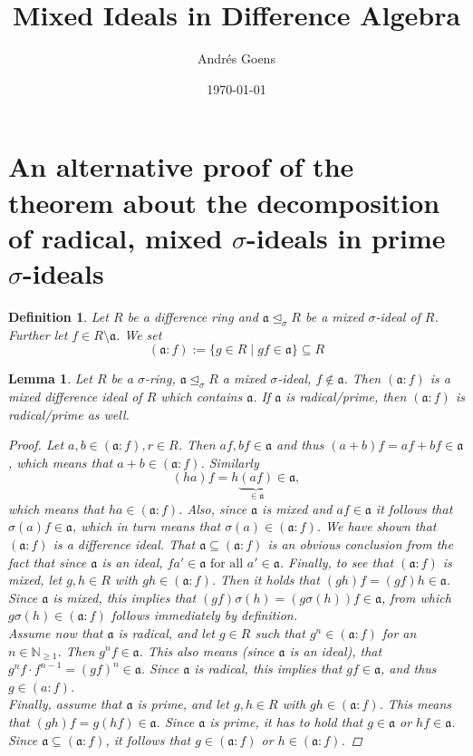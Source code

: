 \documentclass{article}
\title{Mixed Ideals in Difference Algebra}
\author{Andr\'{e}s Goens}
\date{\today}
\def\NE{\mathbb{N}_{\geq1}}
\def\a{\mathfrak{a}}
\def\s{\sigma}
\def\si{\unlhd_{\sigma}}
\def\fa{\text{ for all }}
\newenvironment{bew}{\begin{proof}[Proof]}{\end{proof}}
\theoremstyle{plain}
\newtheorem{lem}[Satz]{Lemma}
\newtheorem{defn}[Satz]{Definition}
\theoremstyle{definition}
\begin{document}
\setlength{\parindent}{1.5em}
\section{An alternative proof of the theorem about the decomposition of radical, mixed $\s$-ideals in prime $\s$-ideals}
\begin{defn}
Let $R$ be a difference ring and $\a \si R$ be a mixed $\s$-ideal of $R$. Further let $f \in R \setminus \a$. We set $$(\a:f):= \{ g \in R \mid gf \in \a \} \subseteq R$$
\end{defn}

\begin{lem}
Let $R$ be a $\s$-ring, $\a \si R$ a mixed $\s$-ideal, $f \notin \a$. Then $(\a:f)$ is a mixed difference ideal of $R$ which contains $\a$. If $\a$ is radical/prime, then $(\a:f)$ is radical/prime as well.
\begin{bew}
Let $a,b \in (\a:f), r \in R$. Then $af, bf \in \a$ and thus $(a + b)f = af + bf \in \a$, which means that $a + b \in (\a:f)$. Similarly $$(ha)f = h\underbrace{(af)}_{\in \a} \in \a,$$
which means that $ha \in (\a:f)$. Also, since $\a$ is mixed and $af \in \a$ it follows that $\s(a)f \in \a$, which in turn means that $\s(a) \in (\a:f)$. We have shown that $(\a:f)$ is a difference ideal. 
That $\a \subseteq (\a:f)$ is an obvious conclusion from the fact that since $\a$ is an ideal, $fa' \in \a \fa a' \in \a$.  Finally, to see that $(\a:f)$ is mixed,
let $g,h \in R$ with $gh \in (\a:f)$. Then it holds that $(gh)f = (gf)h  \in \a$. Since $\a$ is mixed, this implies that $(gf)\s(h) = (g\s(h))f \in \a$, from which $g\s(h) \in (\a:f)$ follows immediately by definition. \\
\indent Assume now that $\a$ is radical, and let $g \in R$ such that $g^n \in (\a:f)$ for an $n \in \NE$. Then $g^nf \in \a$. This also means (since $\a$ is an ideal), that $g^nf \cdot f^{n-1} = (gf)^n \in \a$.
Since $\a$ is radical, this implies that $gf \in \a$, and thus $g \in (a:f)$.\\ 
\indent Finally, assume that $\a$ is prime, and let $g, h \in R$ with $gh \in (\a:f)$. This means that $(gh)f = g(hf) \in \a$. Since $\a$ is prime, it has to hold that $g \in \a$ or $hf \in \a$. Since $\a \subseteq (\a:f)$, it follows that $g \in (\a:f)$ or $h \in (\a:f)$.
\end{bew}
\end{lem}
\end{document}
